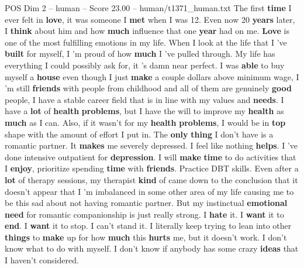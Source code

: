 \begin{textsample}{POS Dim 2 – human – Score 23.00 – human/t1371\_human.txt}  \label{ex:f2_pos_027}
The first \textbf{time} I ever felt in \textbf{love}, it was someone I \textbf{met} when I was 12.
Even now 20 \textbf{years} later, I \textbf{think} about him and how \textbf{much} influence that one \textbf{year} had on me. \textbf{Love} is one of the most fulfilling emotions in my life.
When I look at the life that I ’ve \textbf{built} for myself, I ’m proud of how \textbf{much} I ’ve pulled through.
My life has everything I could possibly ask for, it ’s damn near perfect.
I was \textbf{able} to buy myself a \textbf{house} even though I just \textbf{make} a couple dollars above minimum wage, I ’m still \textbf{friends} with people from childhood and all of them are genuinely \textbf{good} people, I have a stable career field that is in line with my values and \textbf{needs}.
I have a \textbf{lot} of \textbf{health} \textbf{problems}, but I have the will to improve my \textbf{health} as \textbf{much} as I can.
Also, if it wasn't for my \textbf{health} \textbf{problems}, I would be in \textbf{top} shape with the amount of effort I put in.
The \textbf{only} \textbf{thing} I don't have is a romantic partner.
It \textbf{makes} me severely depressed.
I feel like nothing \textbf{helps}.
I ’ve done intensive outpatient for \textbf{depression}.
I will \textbf{make} \textbf{time} to do activities that I \textbf{enjoy}, prioritize spending \textbf{time} with \textbf{friends}.
Practice DBT skills.
Even after a \textbf{lot} of therapy sessions, my therapist \textbf{kind} of came down to the conclusion that it doesn't appear that I ’m imbalanced in some other area of my life causing me to be this sad about not having romantic partner.
But my instinctual \textbf{emotional} \textbf{need} for romantic companionship is just really strong.
I \textbf{hate} it.
I \textbf{want} it to \textbf{end}.
I \textbf{want} it to stop.
I can't stand it.
I literally keep trying to lean into other \textbf{things} to \textbf{make} up for how \textbf{much} this \textbf{hurts} me, but it doesn't work.
I don't know what to do with myself.
I don't know if anybody has some crazy \textbf{ideas} that I haven't considered.

\end{textsample}
